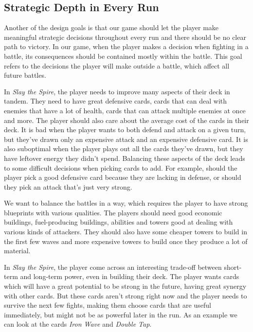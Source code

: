 \subsection{Strategic Depth in Every Run} \label{sec:goal-depth-run}

Another of the design goals is that our game should let the player make meaningful strategic decisions throughout every run and there should be no clear path to victory.
In our game, when the player makes a decision when fighting in a battle, its consequences should be contained mostly within the battle.
This goal refers to the decisions the player will make outside a battle, which affect all future battles.

In \emph{Slay the Spire}, the player needs to improve many aspects of their deck in tandem.
They need to have great defensive cards, cards that can deal with enemies that have a lot of health, cards that can attack multiple enemies at once and more.
The player should also care about the average cost of the cards in their deck.
It is bad when the player wants to both defend and attack on a given turn, but they've drawn only an expensive attack and an expensive defensive card.
It is also suboptimal when the player plays out all the cards they've drawn, but they have leftover energy they didn't spend.
Balancing these aspects of the deck leads to some difficult decisions when picking cards to add.
For example, should the player pick a good defensive card because they are lacking in defense, or should they pick an attack that's just very strong.

We want to balance the battles in a way, which requires the player to have strong blueprints with various qualities.
The players should need good economic buildings, fuel-producing buildings, abilities and towers good at dealing with various kinds of attackers.
They should also have some cheaper towers to build in the first few waves and more expensive towers to build once they produce a lot of material.

In \emph{Slay the Spire}, the player come across an interesting trade-off between short-term and long-term power, even in building their deck.
The player wants cards which will have a great potential to be strong in the future, having great synergy with other cards.
But these cards aren't strong right now and the player needs to survive the next few fights, making them choose cards that are useful immediately, but might not be as powerful later in the run.
As an example we can look at the cards \emph{Iron Wave} and \emph{Double Tap}.

